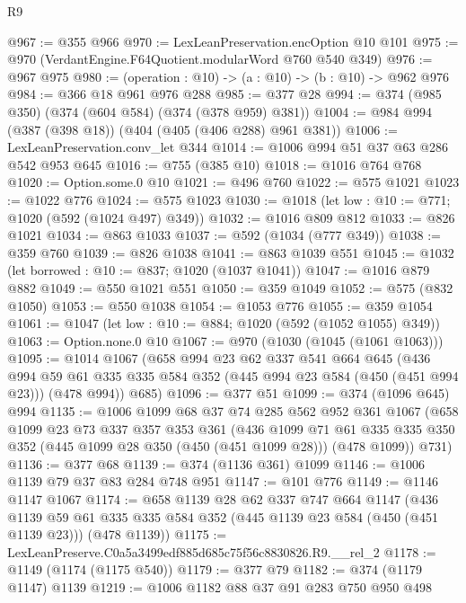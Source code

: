 \begin{lexlean}{R9}
\begin{coremodule}
@967 := @355 @966
@970 := LexLeanPreservation.encOption @10 @101
@975 := @970 (VerdantEngine.F64Quotient.modularWord @760 @540 @349)
@976 := @967 @975
@980 := (operation : @10) -> (a : @10) -> (b : @10) -> @962 @976
@984 := @366 @18 @961 @976 @288
@985 := @377 @28
@994 := @374 (@985 @350) (@374 (@604 @584) (@374 (@378 @959) @381))
@1004 := @984 @994 (@387 (@398 @18)) (@404 (@405 (@406 @288) @961 @381))
@1006 := LexLeanPreservation.conv_let @344
@1014 := @1006 @994 @51 @37 @63 @286 @542 @953 @645
@1016 := @755 (@385 @10)
@1018 := @1016 @764 @768
@1020 := Option.some.{0} @10
@1021 := @496 @760
@1022 := @575 @1021
@1023 := @1022 @776
@1024 := @575 @1023
@1030 := @1018 (let low : @10 := @771; @1020 (@592 (@1024 @497) @349))
@1032 := @1016 @809 @812
@1033 := @826 @1021
@1034 := @863 @1033
@1037 := @592 (@1034 (@777 @349))
@1038 := @359 @760
@1039 := @826 @1038
@1041 := @863 @1039 @551
@1045 := @1032 (let borrowed : @10 := @837; @1020 (@1037 @1041))
@1047 := @1016 @879 @882
@1049 := @550 @1021 @551
@1050 := @359 @1049
@1052 := @575 (@832 @1050)
@1053 := @550 @1038
@1054 := @1053 @776
@1055 := @359 @1054
@1061 := @1047 (let low : @10 := @884; @1020 (@592 (@1052 @1055) @349))
@1063 := Option.none.{0} @10
@1067 := @970 (@1030 (@1045 (@1061 @1063)))
@1095 := @1014
    @1067
    (@658
      @994
      @23
      @62
      @337
      @541
      @664
      @645
      (@436
        @994
        @59
        @61
        @335
        @335
        @584
        @352
        (@445 @994 @23 @584 (@450 (@451 @994 @23)))
        (@478 @994))
      @685)
@1096 := @377 @51
@1099 := @374 (@1096 @645) @994
@1135 := @1006
    @1099
    @68
    @37
    @74
    @285
    @562
    @952
    @361
    @1067
    (@658
      @1099
      @23
      @73
      @337
      @357
      @353
      @361
      (@436
        @1099
        @71
        @61
        @335
        @335
        @350
        @352
        (@445 @1099 @28 @350 (@450 (@451 @1099 @28)))
        (@478 @1099))
      @731)
@1136 := @377 @68
@1139 := @374 (@1136 @361) @1099
@1146 := @1006 @1139 @79 @37 @83 @284 @748 @951
@1147 := @101 @776
@1149 := @1146 @1147 @1067
@1174 := @658
    @1139
    @28
    @62
    @337
    @747
    @664
    @1147
    (@436
      @1139
      @59
      @61
      @335
      @335
      @584
      @352
      (@445 @1139 @23 @584 (@450 (@451 @1139 @23)))
      (@478 @1139))
@1175 := LexLeanPreserve.C0a5a3499edf885d685c75f56c8830826.R9.__rel_2
@1178 := @1149 (@1174 (@1175 @540))
@1179 := @377 @79
@1182 := @374 (@1179 @1147) @1139
@1219 := @1006
    @1182
    @88
    @37
    @91
    @283
    @750
    @950
    @498

\end{coremodule}
\end{lexlean}
